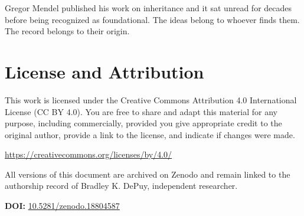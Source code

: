 \documentclass[12pt, letterpaper]{article}
\begin{document}
Gregor Mendel published his work on inheritance and it sat unread for decades
before being recognized as foundational. The ideas belong to whoever finds them.
The record belongs to their origin.
\section{License and Attribution}
\label{sec:org8496556}

This work is licensed under the Creative Commons Attribution 4.0 International
License (CC BY 4.0). You are free to share and adapt this material for any
purpose, including commercially, provided you give appropriate credit to the
original author, provide a link to the license, and indicate if changes were
made.

\url{https://creativecommons.org/licenses/by/4.0/}

All versions of this document are archived on Zenodo and remain linked to the
authorship record of Bradley K. DePuy, independent researcher.

\textbf{DOI:} \href{https://doi.org/10.5281/zenodo.18804587}{10.5281/zenodo.18804587}
\end{document}
